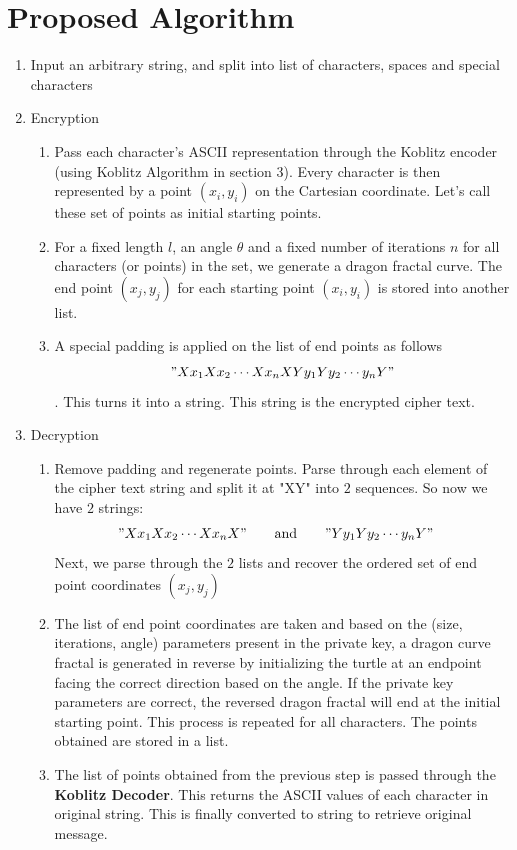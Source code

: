 \documentclass[cryptography,article,submit,moreauthors,pdftex]{Definitions/mdpi}
\begin{document}
\section{Proposed Algorithm}
    \begin{enumerate}
        \item Input an arbitrary string, and split into list of characters, spaces and special characters
        \item Encryption
        \begin{enumerate}
            \item Pass each character's ASCII representation through the Koblitz encoder (using Koblitz Algorithm in section 3). Every character is then represented by a point $(x_i,y_i)$ on the Cartesian coordinate. Let's call these set of points as initial starting points.
            \item For a fixed length $l$, an angle $\theta$ and a fixed number of iterations $n$ for all characters (or points) in the set, we generate a dragon fractal curve. The end point $(x_j,y_j)$ for each starting point $(x_i,y_i)$ is stored into another list.
            \item A special padding is applied on the list of end points as follows $$"Xx_1Xx_2\cdots Xx_nXYy_1Yy_2\cdots y_nY"$$. This turns it into a string. This string is the encrypted cipher text.
        \end{enumerate}
        
        \item Decryption
        \begin{enumerate}
            \item Remove padding and regenerate points. Parse through each element of the cipher text string and split it at "XY" into $2$ sequences. So now we have $2$ strings:
                \begin{align*}
                    "Xx_1Xx_2\cdots Xx_nX"&\qquad\text{and}\qquad"Yy_1Yy_2\cdots y_nY"
                \end{align*}
            Next, we parse through the $2$ lists and recover the ordered set of end point coordinates $(x_j,y_j)$
            \item The list of end point coordinates are taken and based on the (size, iterations, angle) parameters present in the private key, a dragon curve fractal is generated in reverse by initializing the turtle at an endpoint facing the correct direction based on the angle. If the private key parameters are correct, the reversed dragon fractal will end at the initial starting point. This process is repeated for all characters. The points obtained are stored in a list.
            \item The list of points obtained from the previous step is passed through the \textbf{Koblitz Decoder}. This returns the ASCII values of each character in original string. This is finally converted to string to retrieve original message.
        \end{enumerate}
    \end{enumerate}
\end{document}
